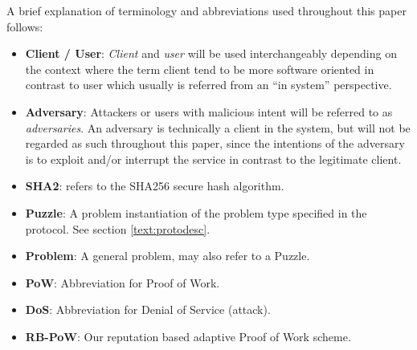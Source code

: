 \begin{comment}
Throughout this paper attackers or users with malicious intent will be referred to as \emph{adversaries}.
\emph{Client} and \emph{user} will be used interchangeably depending on the context where the term client tend to be more software oriented in contrast to user which usually is referred from an ``in system'' perspective.
An adversary is technically a client in the system, but will not be regarded as such throughout this paper, since the intentions of the adversary is to exploit and/or interrupt the service in contrary to the legitimate client. 
\end{comment}
A brief explanation of terminology and abbreviations used throughout this paper follows:
\begin{itemize}
\item \textbf{Client / User}: \emph{Client} and \emph{user} will be used interchangeably depending on the context where the term client tend to be more software oriented in contrast to user which usually is referred from an ``in system'' perspective.
\item \textbf{Adversary}: Attackers or users with malicious intent will be referred to as \emph{adversaries}. An adversary is technically a client in the system, but will not be regarded as such throughout this paper, since the intentions of the adversary is to exploit and/or interrupt the service in contrast to the legitimate client. 
\item {\textbf{SHA2}}: refers to the SHA256 secure hash algorithm\cite{sha2}.
\item \textbf{Puzzle}: A problem instantiation of the problem type specified in the protocol. See section \ref{text:protodesc}.
\item \textbf{Problem}: A general problem, may also refer to a Puzzle.
\item \textbf{PoW}: Abbreviation for Proof of Work.
\item \textbf{DoS}: Abbreviation for Denial of Service (attack).
\item \textbf{RB-PoW}: Our reputation based adaptive Proof of Work scheme.
\end{itemize}
